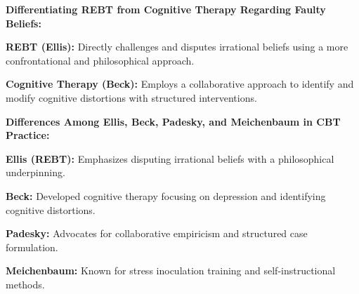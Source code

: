\begin{coloredlist}
    \item \textbf{Differentiating REBT from Cognitive Therapy Regarding Faulty Beliefs:}
    \begin{coloredlist}
        \item \textbf{REBT (Ellis):} Directly challenges and disputes irrational beliefs using a more confrontational and philosophical approach.
        \item \textbf{Cognitive Therapy (Beck):} Employs a collaborative approach to identify and modify cognitive distortions with structured interventions.
    \end{coloredlist}

    \item \textbf{Differences Among Ellis, Beck, Padesky, and Meichenbaum in CBT Practice:}
    \begin{coloredlist}
        \item \textbf{Ellis (REBT):} Emphasizes disputing irrational beliefs with a philosophical underpinning.
        \item \textbf{Beck:} Developed cognitive therapy focusing on depression and identifying cognitive distortions.
        \item \textbf{Padesky:} Advocates for collaborative empiricism and structured case formulation.
        \item \textbf{Meichenbaum:} Known for stress inoculation training and self-instructional methods.
    \end{coloredlist}
\end{coloredlist}

